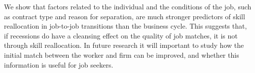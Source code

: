 \documentclass[11pt, oneside]{article}
\begin{document}
	\vspace{2mm}
	
	We show that factors related to the individual and the conditions of the job, such as contract type and reason for separation, are much stronger predictors of skill reallocation in job-to-job transitions than the business cycle. This suggests that, if recessions do have a cleansing effect on the quality of job matches, it is not through skill reallocation.
	In future research it will important to study how the initial match between the worker and firm can be improved, and whether this information is useful for job seekers. 
	
	\vspace{2mm}
	
	
	
	\vspace{2mm}
	
\end{document}
